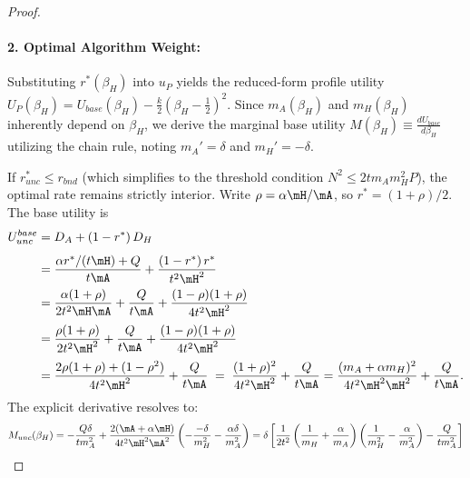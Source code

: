 \begin{proof}
\paragraph{2. Optimal Algorithm Weight:}
Substituting $r^*(\beta_H)$ into $u_P$ yields the reduced-form profile utility $U_P(\beta_H) = U_{base}(\beta_H) - \frac{k}{2}\left(\beta_H - \frac{1}{2}\right)^2$. Since $m_A(\beta_H)$ and $m_H(\beta_H)$ inherently depend on $\beta_H$, we derive the marginal base utility $M(\beta_H) \equiv \frac{d U_{base}}{d \beta_H}$ utilizing the chain rule, noting $m_A' = \delta$ and $m_H' = -\delta$.

If $r_{unc}^* \le r_{bnd}$ (which simplifies to the threshold condition $N^2 \le 2 t m_A m_H^2 P$), the optimal rate remains strictly interior. 
Write $\rho=\alpha\mH/\mA$, so $r^*=(1+\rho)/2$. The base utility is
\begin{align*}
U_{unc}^{base} &= D_A+(1-r^*)\,D_H\\[4pt]
&= \frac{\alpha r^*/(t\mH)+Q}{t\mA}
+\frac{(1-r^*)\,r^*}{t^{2}\mH^{2}}\\
&=\frac{\alpha(1+\rho)}{2t^{2}\mH \mA}
+\frac{Q}{t\mA}
+\frac{(1-\rho)(1+\rho)}{4t^{2}\mH^{2}}\\[2pt]
&=\frac{\rho(1+\rho)}{2t^{2}\mH^{2}}
+\frac{Q}{t\mA}
+\frac{(1-\rho)(1+\rho)}{4t^{2}\mH^{2}}\\[2pt]
&=\frac{2\rho(1+\rho)+(1-\rho^{2})}{4t^{2}\mH^{2}}
+\frac{Q}{t\mA}
\;=\;\frac{(1+\rho)^{2}}{4t^{2}\mH^{2}}
+\frac{Q}{t\mA} = \frac{(m_A+\alpha m_H)^{2}}{4t^{2}\mH^{2}\mH^2}
+\frac{Q}{t\mA}.
\end{align*}
The explicit derivative resolves to:
\begin{equation*}
    M_{unc}(\beta_H) = - \frac{Q \delta}{t m_A^2} + \frac{2(\mA+\alpha\mH)}{4t^2\mH^2\mA^2} \left( - \frac{-\delta}{m_H^2} - \frac{\alpha \delta}{m_A^2} \right) = \delta \left[ \frac{1}{2t^2} \left( \frac{1}{m_H} + \frac{\alpha}{m_A} \right) \left( \frac{1}{m_H^2} - \frac{\alpha}{m_A^2} \right) - \frac{Q}{t m_A^2} \right]
\end{equation*}


\end{proof}
